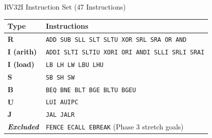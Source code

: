\documentclass[aspectratio=169,10pt]{beamer}
\begin{document}
\begin{frame}{RV32I Instruction Set (47 Instructions)}
  \renewcommand{\arraystretch}{1.2}
  \small
  \begin{tabular}{>{\bfseries}l p{9.5cm}}
    \toprule
    Type & Instructions \\
    \midrule
    R & \texttt{ADD SUB SLL SLT SLTU XOR SRL SRA OR AND} \\
    \rowcolor{black!5}
    I (arith) & \texttt{ADDI SLTI SLTIU XORI ORI ANDI SLLI SRLI SRAI} \\
    I (load)  & \texttt{LB LH LW LBU LHU} \\
    \rowcolor{black!5}
    S         & \texttt{SB SH SW} \\
    B         & \texttt{BEQ BNE BLT BGE BLTU BGEU} \\
    \rowcolor{black!5}
    U         & \texttt{LUI AUIPC} \\
    J         & \texttt{JAL JALR} \\
    \midrule
    \textit{Excluded} & \texttt{FENCE ECALL EBREAK} \quad (Phase 3 stretch goals) \\
    \bottomrule
  \end{tabular}


\end{frame}
\end{document}
